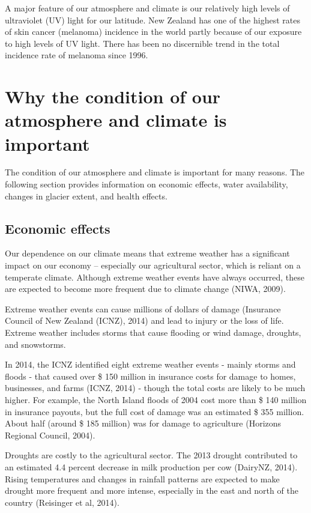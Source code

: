 \documentclass[11pt]{article} %
\begin{document}
A major feature of our atmosphere and climate is our relatively high levels of ultraviolet (UV) light for our latitude. New Zealand has one of the highest rates of skin cancer (melanoma) incidence in the world partly because of our exposure to high levels of UV light. There has been no discernible trend in the total incidence rate of melanoma since 1996.

\section{Why the condition of our atmosphere and climate is important}
The condition of our atmosphere and climate is important for many reasons. The following section provides information on economic effects, water availability, changes in glacier extent, and health effects.

\subsection{Economic effects}
Our dependence on our climate means that extreme weather has a significant impact on our economy – especially our agricultural sector, which is reliant on a temperate climate. Although extreme weather events have always occurred, these are expected to become more frequent due to climate change (NIWA, 2009).

Extreme weather events can cause millions of dollars of damage (Insurance Council of New Zealand (ICNZ), 2014) and lead to injury or the loss of life. Extreme weather includes storms that cause flooding or wind damage, droughts, and snowstorms.

In 2014, the ICNZ identified eight extreme weather events - mainly storms and floods - that caused over \$ 150 million in insurance costs for damage to homes, businesses, and farms (ICNZ, 2014) - though the total costs are likely to be much higher. For example, the North Island floods of 2004 cost more than \$ 140 million in insurance payouts, but the full cost of damage was an estimated \$ 355 million. About half (around \$ 185 million) was for damage to agriculture (Horizons Regional Council, 2004).

Droughts are costly to the agricultural sector. The 2013 drought contributed to an estimated 4.4 percent decrease in milk production per cow (DairyNZ, 2014). Rising temperatures and changes in rainfall patterns are expected to make drought more frequent and more intense, especially in the east and north of the country (Reisinger et al, 2014).
\end{document}

